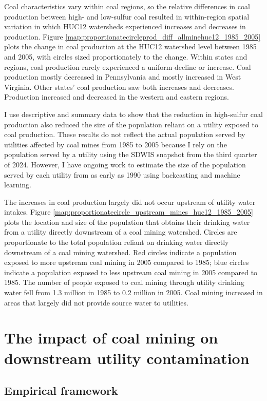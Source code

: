 \documentclass[12pt]{article}
\begin{document}
Coal characteristics vary within coal regions, so the relative differences in coal production between high- and low-sulfur coal resulted in within-region spatial variation in which HUC12 watersheds experienced increases and decreases in production. Figure \ref{map:proportionatecircleprod_diff_allminehuc12_1985_2005} plots the change in coal production at the HUC12 watershed level between 1985 and 2005, with circles sized proportionately to the change. Within states and regions, coal production rarely experienced a uniform decline or increase. Coal production mostly decreased in Pennsylvania and mostly increased in West Virginia. Other states' coal production saw both increases and decreases. Production increased and decreased in the western and eastern regions. 

I use descriptive and summary data to show that the reduction in high-sulfur coal production also reduced the size of the population reliant on a utility exposed to coal production. These results do not reflect the actual population served by utilities affected by coal mines from 1985 to 2005 because I rely on the population served by a utility using the SDWIS snapshot from the third quarter of 2024. However, I have ongoing work to estimate the size of the population served by each utility from as early as 1990 using backcasting and machine learning.

The increases in coal production largely did not occur upstream of utility water intakes. Figure \ref{map:proportionatecircle_upstream_mines_huc12_1985_2005} plots the location and size of the population that obtains their drinking water from a utility directly downstream of a coal mining watershed. Circles are proportionate to the total population reliant on drinking water directly downstream of a coal mining watershed. Red circles indicate a population exposed to more upstream coal mining in 2005 compared to 1985; blue circles indicate a population exposed to less upstream coal mining in 2005 compared to 1985. The number of people exposed to coal mining through utility drinking water fell from 1.3 million in 1985 to 0.2 million in 2005. Coal mining increased in areas that largely did not provide source water to utilities.

\section{The impact of coal mining on downstream utility contamination}\label{sec:concentration}

\subsection{Empirical framework}
\end{document}
